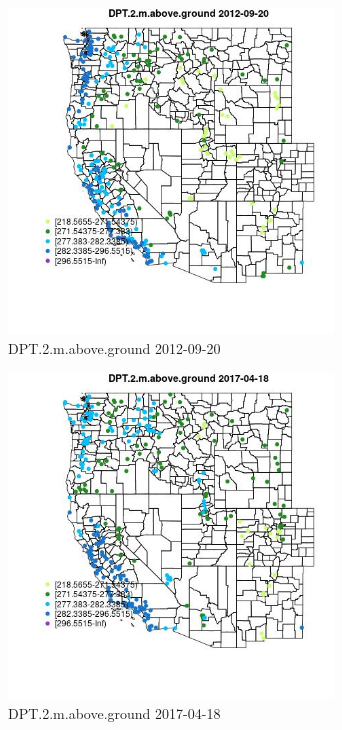 \begin{figure} 
\centering  
\includegraphics[width=0.77\textwidth]{Code_Outputs/Report_ML_input_PM25_Step4_part_e_de_duplicated_aves_compiled_2019-05-14wNAs_MapObsDPT2maboveground2012-09-20.jpg} 
\caption{\label{fig:Report_ML_input_PM25_Step4_part_e_de_duplicated_aves_compiled_2019-05-14wNAsMapObsDPT2maboveground2012-09-20}DPT.2.m.above.ground 2012-09-20} 
\end{figure} 
 

\begin{figure} 
\centering  
\includegraphics[width=0.77\textwidth]{Code_Outputs/Report_ML_input_PM25_Step4_part_e_de_duplicated_aves_compiled_2019-05-14wNAs_MapObsDPT2maboveground2017-04-18.jpg} 
\caption{\label{fig:Report_ML_input_PM25_Step4_part_e_de_duplicated_aves_compiled_2019-05-14wNAsMapObsDPT2maboveground2017-04-18}DPT.2.m.above.ground 2017-04-18} 
\end{figure} 
 

